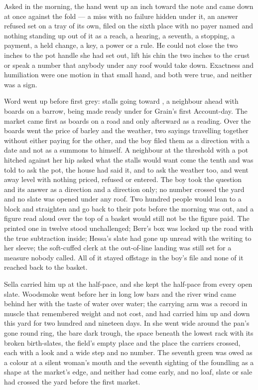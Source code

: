 Asked in the morning, the hand went up an inch toward the note and came down at once against the fold --- a miss with no failure hidden under it, an answer refused set on a tray of its own, filed on the sixth place with no payer named and nothing standing up out of it as a reach, a hearing, a seventh, a stopping, a payment, a held change, a key, a power or a rule. He could not close the two inches to the pot handle she had set out, lift his chin the two inches to the crust or speak a number that anybody under any roof would take down. Exactness and humiliation were one motion in that small hand, and both were true, and neither was a sign.

\scenebreak

Word went up  before first grey: stalls going toward , a neighbour ahead with boards on a barrow,  being made ready under  for Grain's first Account-day. The market came first as boards on a road and only afterward as a reading. Over the boards went the price of barley and the weather, two sayings travelling together without either paying for the other, and the boy filed them as a direction with a date and not as a summons to himself. A neighbour at the threshold with a pot hitched against her hip asked what the stalls would want come the tenth and was told to ask the pot, the house had said it, and to ask the weather too, and went away level with nothing priced, refused or entered. The boy took the question and its answer as a direction and a direction only; no number crossed the yard and no slate was opened under any roof. Two hundred people would lean to a block and straighten and go back to their pots before the morning was out, and a figure read aloud over the top of a basket would still not be the figure paid. The printed one in twelve stood unchallenged; Berr's box was locked up the road with the true subtraction inside; Hessa's slate had gone up unread with the writing to her sleeve; the soft-cuffed clerk at the out-of-line landing was still set for a measure nobody called. All of it stayed offstage in the boy's file and none of it reached back to the basket.

Sella carried him up at the half-pace, and she kept the half-pace from every open slate. Woodsmoke went before her in long low bars and the river wind came behind her with the taste of water over water; the carrying arm was a record in muscle that remembered weight and not cost, and had carried him up and down this yard for two hundred and nineteen days. In  she went wide around the pan's gone round ring, the bare dark trough, the space beneath the lowest rack with its broken birth-slates, the field's empty place and the place the carriers crossed, each with a look and a wide step and no number. The seventh green was owed as a colour at a silent woman's mouth and the seventh sighting of the foundling as a shape at the market's edge, and neither had come early, and no loaf, slate or sale had crossed the yard before the first market.

